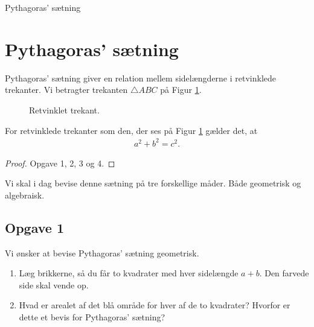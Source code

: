\begin{center}
\Huge
	Pythagoras' sætning
\end{center}

\section*{Pythagoras' sætning}

Pythagoras' sætning giver en relation mellem sidelængderne i retvinklede trekanter. Vi betragter trekanten
$\triangle ABC$ på Figur \ref{fig:pytte}.
\begin{figure}[H]
	\centering
	\caption{Retvinklet trekant.}
	\label{fig:pytte}
\end{figure}
\begin{setn}[Pythagoras]
	For retvinklede trekanter som den, der ses på Figur \ref{fig:pytte} gælder det, at 
	\begin{align*}
		a^2 + b^2 = c^2.
	\end{align*}
\end{setn}
\begin{proof}
	Opgave 1, 2, 3 og 4.
\end{proof}

Vi skal i dag bevise denne sætning på tre forskellige måder. Både geometrisk og algebraisk. 

\newpage
\subsection*{Opgave 1}
Vi ønsker at bevise Pythagoras' sætning geometrisk. 

\begin{enumerate}[label=\roman*)]
	\item Læg brikkerne, så du får to kvadrater med hver sidelængde $a + b$. Den farvede side skal vende op.
	\item Hvad er arealet af det blå område for hver af de to kvadrater? Hvorfor er dette et bevis for
	 Pythagoras' sætning?
\end{enumerate}

